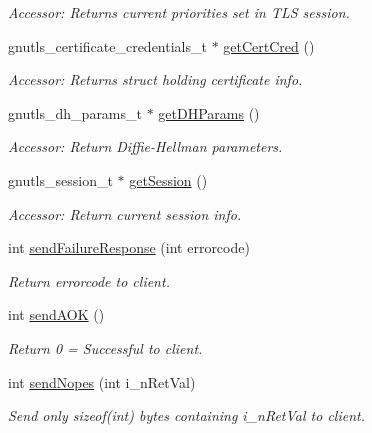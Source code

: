 \begin{DoxyCompactItemize}
\begin{DoxyCompactList}\small\item\em Accessor\-: Returns current priorities set in T\-L\-S session. \end{DoxyCompactList}\item 
gnutls\-\_\-certificate\-\_\-credentials\-\_\-t $\ast$ \hyperlink{classGTBCommunication_aaff60196d8623e94588a9efb1593fa7e}{get\-Cert\-Cred} ()
\begin{DoxyCompactList}\small\item\em Accessor\-: Returns struct holding certificate info. \end{DoxyCompactList}\item 
gnutls\-\_\-dh\-\_\-params\-\_\-t $\ast$ \hyperlink{classGTBCommunication_a73df04ac0442aabd5a1919d6e95501e8}{get\-D\-H\-Params} ()
\begin{DoxyCompactList}\small\item\em Accessor\-: Return Diffie-\/\-Hellman parameters. \end{DoxyCompactList}\item 
gnutls\-\_\-session\-\_\-t $\ast$ \hyperlink{classGTBCommunication_a762b0f4bb1e3f27c01e1ce4b2f3aca65}{get\-Session} ()
\begin{DoxyCompactList}\small\item\em Accessor\-: Return current session info. \end{DoxyCompactList}\item 
int \hyperlink{classGTBCommunication_a48ac2db7bb407da8d59cfbf69110e598}{send\-Failure\-Response} (int errorcode)
\begin{DoxyCompactList}\small\item\em Return errorcode to client. \end{DoxyCompactList}\item 
int \hyperlink{classGTBCommunication_a53163e476fffb9c3b51b7297b5963e6b}{send\-A\-O\-K} ()
\begin{DoxyCompactList}\small\item\em Return 0 = Successful to client. \end{DoxyCompactList}\item 
int \hyperlink{classGTBCommunication_a83fbad40d9605078ff9a8ce29c57b383}{send\-Nopes} (int i\-\_\-n\-Ret\-Val)
\begin{DoxyCompactList}\small\item\em Send only sizeof(int) bytes containing i\-\_\-n\-Ret\-Val to client. \end{DoxyCompactList}\item 

\end{DoxyCompactItemize}
